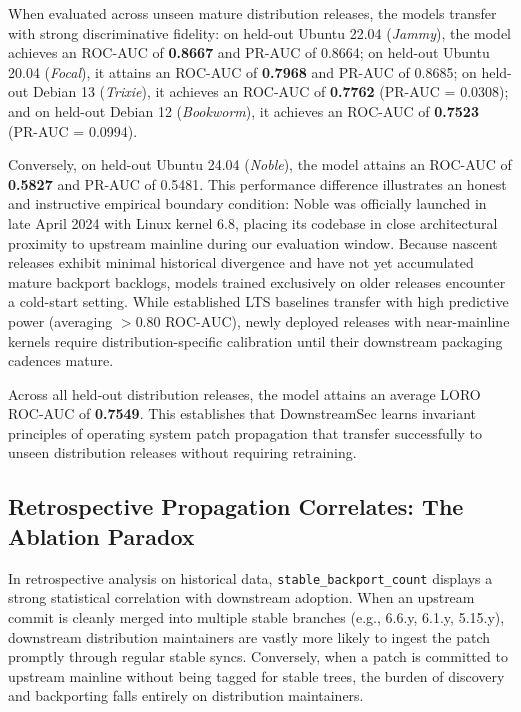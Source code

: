 \documentclass[final,5p,times,twocolumn]{elsarticle}
\begin{document}
When evaluated across unseen mature distribution releases, the models transfer with strong discriminative fidelity: on held-out Ubuntu 22.04 (\textit{Jammy}), the model achieves an ROC-AUC of \textbf{0.8667} and PR-AUC of 0.8664; on held-out Ubuntu 20.04 (\textit{Focal}), it attains an ROC-AUC of \textbf{0.7968} and PR-AUC of 0.8685; on held-out Debian 13 (\textit{Trixie}), it achieves an ROC-AUC of \textbf{0.7762} (PR-AUC = 0.0308); and on held-out Debian 12 (\textit{Bookworm}), it achieves an ROC-AUC of \textbf{0.7523} (PR-AUC = 0.0994).

Conversely, on held-out Ubuntu 24.04 (\textit{Noble}), the model attains an ROC-AUC of \textbf{0.5827} and PR-AUC of 0.5481. This performance difference illustrates an honest and instructive empirical boundary condition: Noble was officially launched in late April 2024 with Linux kernel 6.8, placing its codebase in close architectural proximity to upstream mainline during our evaluation window. Because nascent releases exhibit minimal historical divergence and have not yet accumulated mature backport backlogs, models trained exclusively on older releases encounter a cold-start setting. While established LTS baselines transfer with high predictive power (averaging $>0.80$ ROC-AUC), newly deployed releases with near-mainline kernels require distribution-specific calibration until their downstream packaging cadences mature.

Across all held-out distribution releases, the model attains an average LORO ROC-AUC of \textbf{0.7549}. This establishes that DownstreamSec learns invariant principles of operating system patch propagation that transfer successfully to unseen distribution releases without requiring retraining.

\subsection{Retrospective Propagation Correlates: The Ablation Paradox}
In retrospective analysis on historical data, \texttt{stable\_backport\_count} displays a strong statistical correlation with downstream adoption. When an upstream commit is cleanly merged into multiple stable branches (e.g., 6.6.y, 6.1.y, 5.15.y), downstream distribution maintainers are vastly more likely to ingest the patch promptly through regular stable syncs. Conversely, when a patch is committed to upstream mainline without being tagged for stable trees, the burden of discovery and backporting falls entirely on distribution maintainers. 
\end{document}
